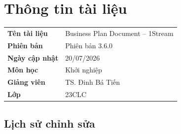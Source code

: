 \documentclass[12pt,a4paper]{article}
\renewcommand{\arraystretch}{1.35}
\newcommand{\ProjectName}{1Stream}
\newcommand{\ClassName}{23CLC}
\newcommand{\InstructorName}{TS. Đinh Bá Tiến}
\newcommand{\SubmissionDate}{20/07/2026}
\newcommand{\DocumentVersion}{Phiên bản 3.6.0}
\begin{document}

\section*{Thông tin tài liệu}
\begin{tabularx}{\linewidth}{@{}L{4.2cm}Y@{}}
\toprule
\textbf{Tên tài liệu} & Business Plan Document -- \ProjectName \\
\textbf{Phiên bản} & \DocumentVersion \\
\textbf{Ngày cập nhật} & \SubmissionDate \\
\textbf{Môn học} & Khởi nghiệp \\
\textbf{Giảng viên} & \InstructorName \\
\textbf{Lớp} & \ClassName \\
\bottomrule
\end{tabularx}

\subsection*{Lịch sử chỉnh sửa}

\begingroup
\small
\setlength{\tabcolsep}{3pt}
\renewcommand{\arraystretch}{1.15}
\setlength{\LTpre}{0pt}
\setlength{\LTpost}{0pt}

\end{document}
